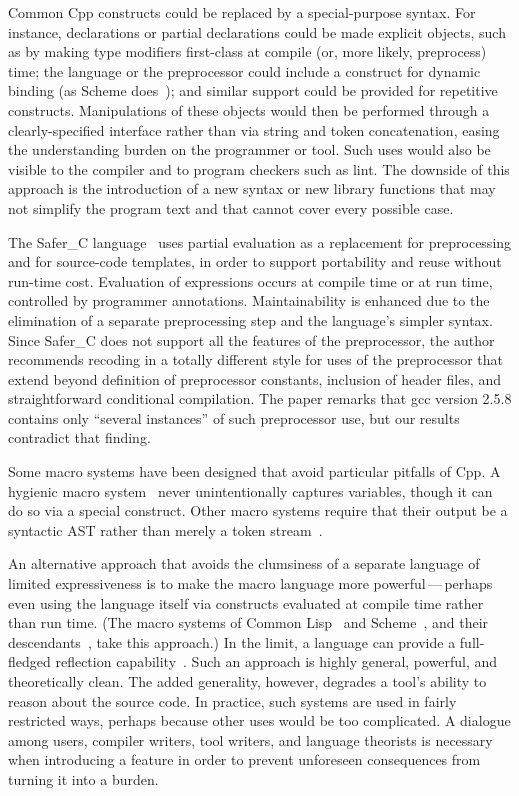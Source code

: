 \documentclass[10pt]{article}
\newcommand{\pkg}[1]{\textsf{#1}}
\begin{document}
Common Cpp constructs could be replaced by a special-purpose syntax.  For
instance, declarations or partial declarations could be made explicit
objects, such as by making type modifiers first-class at compile (or, more
likely, preprocess) time; the language or the preprocessor could include a
construct for dynamic binding (as Scheme does~\cite{KelseyCR98}); and
similar support could be provided for repetitive constructs.  Manipulations
of these objects would then be performed through a clearly-specified
interface rather than via string and token concatenation, easing the
understanding burden on the programmer or tool.  Such uses would also be
visible to the compiler and to program checkers such as lint.  The downside
of this approach is the introduction of a new syntax or new library
functions that may not simplify the program text and that cannot cover
every possible case.

The Safer\_C language~\cite{ICCC::Salomon1996} uses partial evaluation as a
replacement for preprocessing and for source-code templates, in order to
support portability and reuse without run-time cost.  Evaluation of
expressions occurs at compile time or at run time, controlled by programmer
annotations.  Maintainability is enhanced due to the elimination of a
separate preprocessing step and the language's simpler syntax.  Since
Safer\_C does not support all the features of the preprocessor, the author
recommends recoding in a totally different style for uses of the
preprocessor that extend beyond definition of preprocessor constants,
inclusion of header files, and straightforward conditional compilation.
The paper remarks that \pkg{gcc} version 2.5.8 contains only ``several
instances'' of such preprocessor use, but our results contradict that
finding.

Some macro systems have been designed that avoid particular pitfalls of Cpp.
A hygienic macro system~\cite{lfp86*151} never unintentionally captures
variables, though it can do so via a special construct.
Other macro systems require that their output be a syntactic AST rather
than merely a token stream~\cite{WeiseC93}.

An alternative approach that avoids the clumsiness of a separate language
of limited expressiveness is to make the macro language more
powerful\,---\,perhaps even using the language itself via constructs
evaluated at compile time rather than run time.  (The macro systems of
Common Lisp~\cite{commonlisp:languagespec} and
Scheme~\cite{KelseyCR98}, and their descendants~\cite{WeiseC93}, take
this approach.)  In the limit, a language can provide a full-fledged
reflection capability~\cite{kicz91}.  Such an approach is highly general,
powerful, and theoretically clean.  The added generality, however, degrades
a tool's ability to reason about the source code.  In practice, such
systems are used in fairly restricted ways, perhaps because other uses
would be too complicated.  A dialogue among users, compiler writers, tool
writers, and language theorists is necessary when introducing a feature in
order to prevent unforeseen consequences from turning it into a burden.
\end{document}
